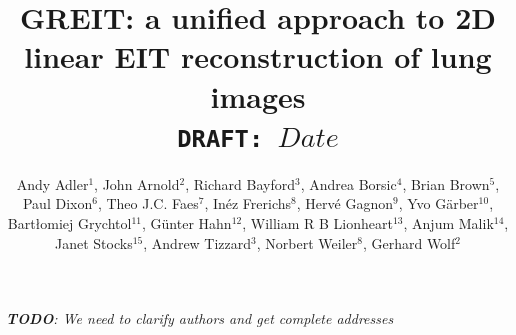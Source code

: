 \documentclass[12pt]{iopart}
\begin{document}
\title[GREIT: linear EIT image reconstruction]{%
GREIT: a unified approach to 2D linear EIT reconstruction of
       lung images
\\
{\small \tt DRAFT: $Date$}
}

\author{Andy Adler$^{1}$,
        John Arnold$^{2}$,
        Richard Bayford$^{3}$,
        Andrea Borsic$^{4}$,
        Brian Brown$^{5}$,
        Paul Dixon$^{6}$,
        Theo J.C. Faes$^{7}$,
        In\'ez Frerichs$^{8}$,
        Herv\'e Gagnon$^{9}$,
        Yvo G\"arber$^{10}$,
        Bart\l{}omiej Grychtol$^{11}$, 
        G\"unter Hahn$^{12}$,
        William R B Lionheart$^{13}$,
        Anjum Malik$^{14}$,
        Janet Stocks$^{15}$,
        Andrew Tizzard$^{3}$,
        Norbert Weiler$^{8}$,
        Gerhard Wolf$^{2}$%
       }

{\em {\bf TODO}: We need to clarify authors and get complete addresses}
\address{ $^{1}$Systems and Computer Engineering,
                Carleton University, Ottawa, Canada}
\address{ $^{2}$Division of Critical Care Medicine, Department of Anesthesia,
                Children's Hospital Boston, Harvard Medical School,
                Boston, MA, USA}
\address{ $^{3}$School of Health and Social Sciences,
                Middlesex University, London, UK}
\address{ $^{4}$School of Engineering, 
                Dartmouth College, Hanover, NH, USA}
\address{ $^{5}$Medical Physics, University of Sheffield, UK}
\address{ $^{6}$Cardinal Health Care, London, UK}
\address{ $^{7}$Department of Physics and Medical Technology,
                V.U. university medical center, Amsterdam, Netherlands}
\address{ $^{8}$Department of Anaesthesiology and Intensive Care Medicine,
                University of Schleswig-Holstein, Kiel, Germany}
\address{ $^{9}$D\'epartement de g\'enie \'electrique,
                \'Ecole Polytechnique de Montr\'eal, Canada}
\address{$^{10}$Dr\"ager Medical, L\"ubeck, Germany}
\address{$^{11}$University of Strathclyde, Glasgow, UK}
\address{$^{12}$Department of Anaesthesiological Research,
                University of G\"ottingen, Germany}
\address{$^{13}$School of Mathematics, University of Manchester, UK}
\address{$^{14}$Maltron International, Rayleigh, UK}
\address{$^{15}$Institute of Child Health,
                University College London, UK}
\end{document}
